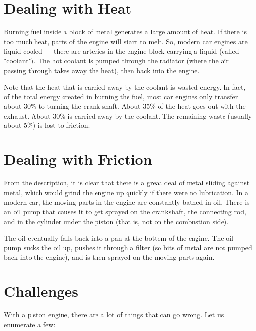 \section{Dealing with Heat}
Burning fuel inside a block of metal generates a large amount of heat. If there is too much heat, parts of the engine will start to melt. So, modern car engines are liquid cooled --- there are arteries in the engine block carrying a liquid (called "coolant"). The hot coolant is pumped through the radiator (where the air passing through takes away the heat), then back into the engine.

Note that the heat that is carried away by the coolant is wasted energy.  In fact, of the total energy created in burning the fuel, most car engines only transfer about 30\% to turning the crank shaft. About 35\% of the heat goes out with the exhaust. About 30\% is carried away by the coolant. 
The remaining waste (usually about 5\%) is lost to friction.

\section{Dealing with Friction}
From the description, it is clear that there is a great deal of metal sliding against metal, which would grind the engine up quickly if there were no lubrication. In a modern car, the moving parts in the engine are constantly bathed in oil. There is an oil pump that causes it to get sprayed on the crankshaft, the connecting rod, and in the cylinder under the piston (that is, not on the combustion side). 

The oil eventually falls back into a pan at the bottom of the engine.  The oil pump sucks the oil up, pushes it through a filter (so bits of metal are not pumped back into the engine), and is then sprayed on the moving parts again.

\section{Challenges}
With a piston engine, there are a lot of things that can go wrong. Let us enumerate a few:

